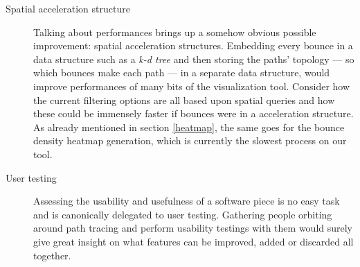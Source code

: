 \begin{description}
	\item[Spatial acceleration structure] Talking about performances brings up a somehow obvious possible improvement: spatial acceleration structures. Embedding every bounce in a data structure such as a \textit{k-d tree} \cite{bentley1975multidimensional} and then storing the paths' topology --- so which bounces make each path --- in a separate data structure, would improve performances of many bits of the visualization tool. Consider how the current filtering options are all based upon spatial queries and how these could be immensely faster if bounces were in a acceleration structure. As already mentioned in section \ref{heatmap}, the same goes for the bounce density heatmap generation, which is currently the slowest process on our tool.
	\item[User testing] Assessing the usability and usefulness of a software piece is no easy task and is canonically delegated to user testing. Gathering people orbiting around path tracing and perform usability testings with them would surely give great insight on what features can be improved, added or discarded all together. 
\end{description}